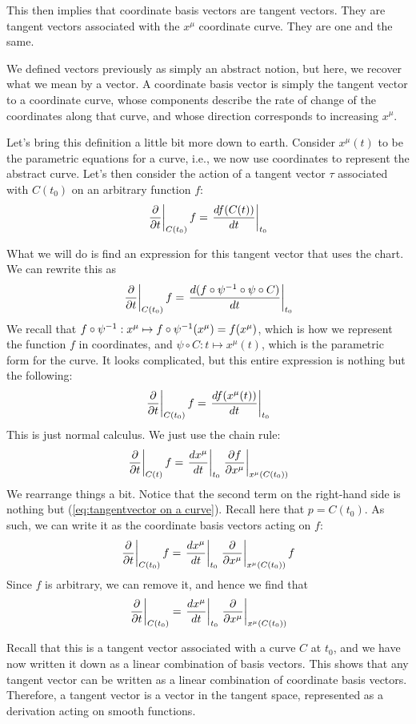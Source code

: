 		This then implies that coordinate basis vectors are tangent vectors.
		They are tangent vectors associated with the $x^\mu$ coordinate curve.
		They are one and the same.

		We defined vectors previously as simply an abstract notion, but here,
		we recover what we mean by a vector. A coordinate basis vector is simply
		the tangent vector to a coordinate curve, whose components describe the
		rate of change of the coordinates along that curve, and whose direction
		corresponds to increasing $x^\mu$.

		Let's bring this definition a little bit more down to earth. Consider
		$x^\mu(t)$ to be the parametric equations for a curve, i.e., we now use
		coordinates to represent the abstract curve. Let's then consider the action
		of a tangent vector $\tau$ associated with $C(t_0)$ on an arbitrary function $f$:
		\[
			\eval{\pdv{}{t}}_{C(t_0)}f
			= \eval{\dv{f(C(t))}{t}}_{t_0}
		\]

		What we will do is find an expression for this tangent vector that uses the chart.
		We can rewrite this as
		\[
			\eval{\pdv{}{t}}_{C(t_0)}f
			= \eval{\dv{(f\circ\psi\inv\circ\psi\circ C)}{t}}_{t_0}
		\]
		We recall that
		$f\circ\psi^{-1}:x^\mu\mapsto f\circ\psi^{-1}(x^\mu)=f(x^\mu)$,
		which is how we represent the function $f$ in coordinates, and
		$\psi\circ C:t\mapsto x^\mu(t)$, which is the parametric form for the curve.
		It looks complicated, but this entire expression is nothing but the following:
		\[
			\eval{\pdv{}{t}}_{C(t_0)}f
			= \eval{\dv{f(x^\mu(t))}{t}}_{t_0}
		\]
		This is just normal calculus. We just use the chain rule:
		\[
			\eval{\pdv{}{t}}_{C(t)} f
			= \eval{\dv{x^\mu}{t}}_{t_0}
				\eval{\pdv{f}{x^\mu}}_{x^\mu(C(t_0))}
		\]
		We rearrange things a bit. Notice that the second term on the right-hand side
		is nothing but (\ref{eq:tangentvector on a curve}). Recall here that
		$p=C(t_0)$. As such, we can write it as the coordinate basis vectors acting on $f$:
		\[
			\eval{\pdv{}{t}}_{C(t_0)} f
			= \eval{\dv{x^\mu}{t}}_{t_0}
				\eval{\pdv{}{x^\mu}}_{x^\mu(C(t_0))} f
		\]
		Since $f$ is arbitrary, we can remove it, and hence we find that
		\begin{equation}
			\label{eq:curve as basis}
			\eval{\pdv{}{t}}_{C(t_0)}
			=
			\eval{\dv{x^\mu}{t}}_{t_0}
			\eval{\pdv{}{x^\mu}}_{x^\mu(C(t_0))}
		\end{equation}

		Recall that this is a tangent vector associated with a curve $C$ at $t_0$,
		and we have now written it down as a linear combination of basis vectors.
		This shows that any tangent vector can be written as a linear combination
		of coordinate basis vectors. Therefore, a tangent vector is a vector in
		the tangent space, represented as a derivation acting on smooth functions.

